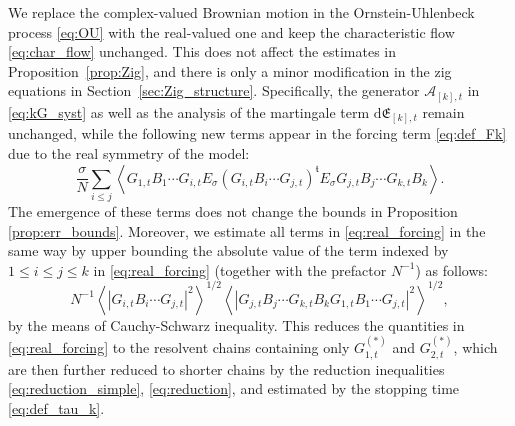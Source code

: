 \documentclass[10pt]{amsart}
\numberwithin{equation}{section}
\newcommand{\dif}{\mathrm{d}}
\begin{document}
We replace the complex-valued Brownian motion in the Ornstein-Uhlenbeck process \eqref{eq:OU} with the real-valued one and keep the characteristic flow \eqref{eq:char_flow} unchanged. This does not affect the estimates in Proposition~\ref{prop:Zig}, and there is only a minor modification in the zig equations in Section~\ref{sec:Zig_structure}. Specifically, the generator $\mathcal{A}_{[k],t}$ in \eqref{eq:kG_syst} as well as the analysis of the martingale term $\dif\mathfrak{E}_{[k],t}$ remain unchanged, while the following new terms appear in the forcing term \eqref{eq:def_Fk} due to the real symmetry of the model:
\begin{equation}
\frac{\sigma}{N}\sum_{i\le j}\left\langle G_{1,t}B_1\cdots G_{i,t}E_\sigma \left(G_{i,t}B_i\cdots G_{j,t}\right)^\mathfrak{t}E_\sigma G_{j,t}B_{j}\cdots G_{k,t}B_k\right\rangle.
\label{eq:real_forcing}
\end{equation}
The emergence of these terms does not change the bounds in Proposition \ref{prop:err_bounds}. Moreover, we estimate all terms in \eqref{eq:real_forcing} in the same way by upper bounding the absolute value of the term indexed by $1\le i\le j\le k$ in \eqref{eq:real_forcing} (together with the prefactor $N^{-1}$) as follows:
\begin{equation}
N^{-1}\left\langle \left\vert G_{i,t}B_i\cdots G_{j,t}\right\vert^2\right\rangle^{1/2}\left\langle \left\vert G_{j,t}B_j\cdots G_{k,t}B_kG_{1,t}B_1\cdots G_{j,t}\right\vert^2\right\rangle^{1/2},
\end{equation}
by the means of Cauchy-Schwarz inequality. This reduces the quantities in \eqref{eq:real_forcing} to the resolvent chains containing only $G_{1,t}^{(*)}$ and $G_{2,t}^{(*)}$, which are then further reduced to shorter chains by the reduction inequalities \eqref{eq:reduction_simple}, \eqref{eq:reduction}, and estimated by the stopping time \eqref{eq:def_tau_k}.
\end{document}
